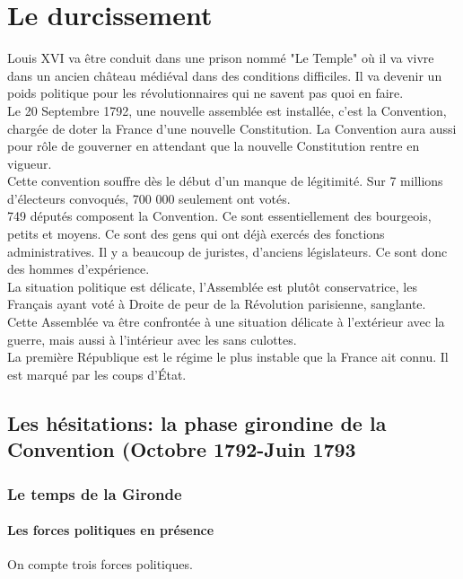 \documentclass[10pt, a4paper, openany]{book}
\begin{document}
\chapter{Le durcissement}

Louis XVI va être conduit dans une prison nommé "Le Temple" où il va vivre dans un ancien château médiéval dans des conditions difficiles. Il va devenir un poids politique pour les révolutionnaires qui ne savent pas quoi en faire. \\
Le 20 Septembre 1792, une nouvelle assemblée est installée, c'est la Convention, chargée de doter la France d'une nouvelle Constitution. La Convention aura aussi pour rôle de gouverner en attendant que la nouvelle Constitution rentre en vigueur. \\
Cette convention souffre dès le début d'un manque de légitimité. Sur 7 millions d'électeurs convoqués, 700 000 seulement ont votés. \\
749 députés composent la Convention. Ce sont essentiellement des bourgeois, petits et moyens. Ce sont des gens qui ont déjà exercés des fonctions administratives. Il y a beaucoup de juristes, d'anciens législateurs. Ce sont donc des hommes d'expérience. \\
La situation politique est délicate, l'Assemblée est plutôt conservatrice, les Français ayant voté à Droite de peur de la Révolution parisienne, sanglante. Cette Assemblée va être confrontée à une situation délicate à l'extérieur avec la guerre, mais aussi à l'intérieur avec les sans culottes. \\
La première République est le régime le plus instable que la France ait connu. Il est marqué par les coups d'État. 

\section{Les hésitations: la phase girondine de la Convention (Octobre 1792-Juin 1793}

\subsection{Le temps de la Gironde}

\subsubsection{Les forces politiques en présence}

On compte trois forces politiques.
\end{document}
